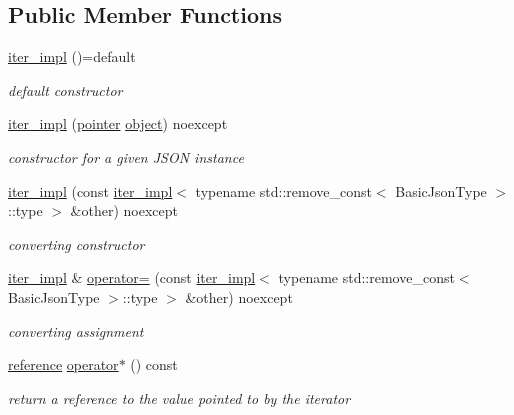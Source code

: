 \subsection*{Public Member Functions}
\begin{DoxyCompactItemize}
\item 
\hyperlink{classnlohmann_1_1detail_1_1iter__impl_a19aa457f9c4af1b7e3af59839132cc5c}{iter\+\_\+impl} ()=default
\begin{DoxyCompactList}\small\item\em default constructor \end{DoxyCompactList}\item 
\hyperlink{classnlohmann_1_1detail_1_1iter__impl_a88a00484ac201c52fc5f613d88a2918b}{iter\+\_\+impl} (\hyperlink{classnlohmann_1_1detail_1_1iter__impl_a69e52f890ce8c556fd68ce109e24b360}{pointer} \hyperlink{namespacenlohmann_1_1detail_a90aa5ef615aa8305e9ea20d8a947980faa8cfde6331bd59eb2ac96f8911c4b666}{object}) noexcept
\begin{DoxyCompactList}\small\item\em constructor for a given J\+S\+ON instance \end{DoxyCompactList}\item 
\hyperlink{classnlohmann_1_1detail_1_1iter__impl_a867f7eb55091be31b013adb3e46816d3}{iter\+\_\+impl} (const \hyperlink{classnlohmann_1_1detail_1_1iter__impl}{iter\+\_\+impl}$<$ typename std\+::remove\+\_\+const$<$ Basic\+Json\+Type $>$\+::type $>$ \&other) noexcept
\begin{DoxyCompactList}\small\item\em converting constructor \end{DoxyCompactList}\item 
\hyperlink{classnlohmann_1_1detail_1_1iter__impl}{iter\+\_\+impl} \& \hyperlink{classnlohmann_1_1detail_1_1iter__impl_a7159ed1cfe7c423a2baef8bea0c94509}{operator=} (const \hyperlink{classnlohmann_1_1detail_1_1iter__impl}{iter\+\_\+impl}$<$ typename std\+::remove\+\_\+const$<$ Basic\+Json\+Type $>$\+::type $>$ \&other) noexcept
\begin{DoxyCompactList}\small\item\em converting assignment \end{DoxyCompactList}\item 
\hyperlink{classnlohmann_1_1detail_1_1iter__impl_a5be8001be099c6b82310f4d387b953ce}{reference} \hyperlink{classnlohmann_1_1detail_1_1iter__impl_a5ca57856d9bba54a5fc51cee891de827}{operator$\ast$} () const
\begin{DoxyCompactList}\small\item\em return a reference to the value pointed to by the iterator \end{DoxyCompactList}\item 

\end{DoxyCompactItemize}
